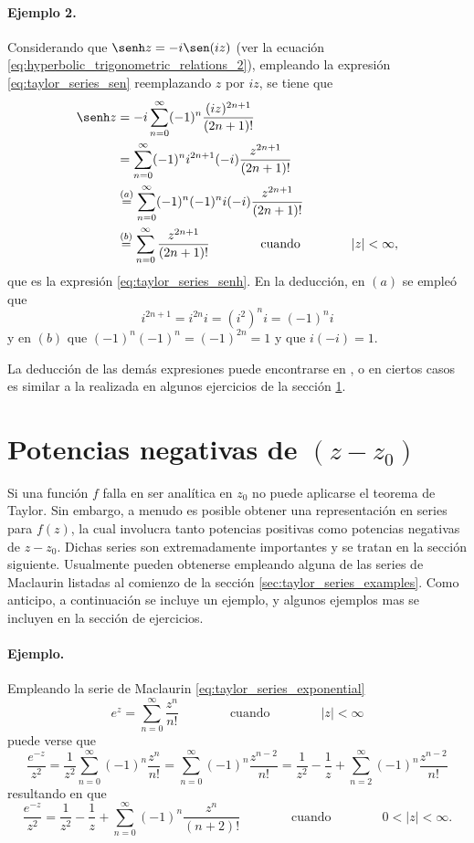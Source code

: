 \documentclass[a4paper]{report}
\begin{document}
\paragraph{Ejemplo 2.} Considerando que \(\senh z=-i\sen(iz)\) (ver la ecuación \ref{eq:hyperbolic_trigonometric_relations_2}), empleando la expresión \ref{eq:taylor_series_sen} reemplazando \(z\) por \(iz\), se tiene que 
\begin{align*}
 \senh z&=-i\sum_{n=0}^\infty(-1)^n\frac{(iz)^{2n+1}}{(2n+1)!}\\
  &=\sum_{n=0}^\infty(-1)^ni^{2n+1}(-i)\frac{z^{2n+1}}{(2n+1)!}\\
  &\overset{(a)}{=}\sum_{n=0}^\infty(-1)^n(-1)^ni(-i)\frac{z^{2n+1}}{(2n+1)!}\\
  &\overset{(b)}{=}\sum_{n=0}^\infty\frac{z^{2n+1}}{(2n+1)!}
 \qquad\qquad\textrm{cuando}\qquad\qquad
 |z|<\infty,
\end{align*}
que es la expresión \ref{eq:taylor_series_senh}. En la deducción, en \((a)\) se empleó que  
\[
 i^{2n+1}=i^{2n}i=(i^2)^ni=(-1)^ni
\]
y en \((b)\) que \((-1)^n(-1)^n=(-1)^{2n}=1\) y que \(i(-i)=1\).
 
La deducción de las demás expresiones puede encontrarse en \cite{brown2013complex}, o en ciertos casos es similar a la realizada en algunos ejercicios de la sección \ref{sec:taylor_series_negative_powers}.

\section{Potencias negativas de \texorpdfstring{\((z-z_0)\)}{(z-z0)}}\label{sec:taylor_series_negative_powers}

Si una función \(f\) falla en ser analítica en \(z_0\) no puede aplicarse el teorema de Taylor. Sin embargo, a menudo es posible obtener una representación en series para \(f(z)\), la cual involucra tanto potencias positivas como potencias negativas de \(z-z_0\). Dichas series son extremadamente importantes y se tratan en la sección siguiente. Usualmente pueden obtenerse empleando alguna de las series de Maclaurin listadas al comienzo de la sección \ref{sec:taylor_series_examples}. Como anticipo, a continuación se incluye un ejemplo, y algunos ejemplos mas se incluyen en la sección de ejercicios.

\paragraph{Ejemplo.} Empleando la serie de Maclaurin \ref{eq:taylor_series_exponential}
\[
 e^z=\sum_{n=0}^\infty\frac{z^n}{n!}
 \qquad\qquad\textrm{cuando}\qquad\qquad
 |z|<\infty
\]
puede verse que 
\[
 \frac{e^{-z}}{z^2}=\frac{1}{z^2}\sum_{n=0}^\infty(-1)^n\frac{z^n}{n!}=\sum_{n=0}^\infty(-1)^n\frac{z^{n-2}}{n!}
 =\frac{1}{z^2}-\frac{1}{z}+\sum_{n=2}^\infty(-1)^n\frac{z^{n-2}}{n!}
\]
resultando en que 
\[
 \frac{e^{-z}}{z^2}=\frac{1}{z^2}-\frac{1}{z}+\sum_{n=0}^\infty(-1)^n\frac{z^{n}}{(n+2)!}
 \qquad\qquad\textrm{cuando}\qquad\qquad
 0<|z|<\infty.
\]
\end{document}
